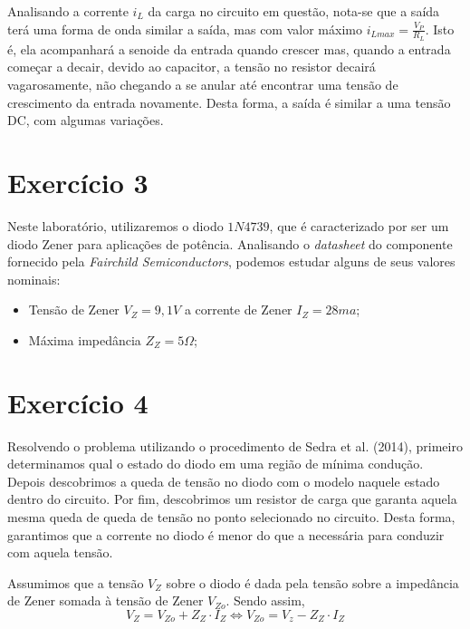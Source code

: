 \documentclass[12pt, a4paper, twoside]{article}
\begin{document}
Analisando a corrente $i_L$ da carga no circuito em questão, nota-se que a saída terá uma forma de onda similar a saída, mas com valor máximo $i_{Lmax} = \frac{V_P}{R_L}$. Isto é, ela acompanhará a senoide da entrada quando crescer mas, quando a entrada começar a decair, devido ao capacitor, a tensão no resistor decairá vagarosamente, não chegando a se anular até encontrar uma tensão de crescimento da entrada novamente. Desta forma, a saída é similar a uma tensão DC, com algumas variações.

\section{Exercício 3}

Neste laboratório, utilizaremos o diodo $1N4739$, que é caracterizado por ser um diodo Zener para aplicações de potência. Analisando o \textit{datasheet} do componente fornecido pela \textit{Fairchild Semiconductors}, podemos estudar alguns de seus valores nominais:

\begin{itemize}
    \item Tensão de Zener $V_Z = 9,1V$ a corrente de Zener $I_Z = 28ma$;
    \item Máxima impedância $Z_Z = 5 \Omega$;
\end{itemize}

\section{Exercício 4}

Resolvendo o problema utilizando o procedimento de Sedra et al. (2014), primeiro determinamos qual o estado do diodo em uma região de mínima condução. Depois descobrimos a queda de tensão no diodo com o modelo naquele estado dentro do circuito. Por fim, descobrimos um resistor de carga que garanta aquela mesma queda de queda de tensão no ponto selecionado no circuito. Desta forma, garantimos que a corrente no diodo é menor do que a necessária para conduzir com aquela tensão.

Assumimos que a tensão $V_Z$ sobre o diodo é dada pela tensão sobre a impedância de Zener somada à tensão de Zener $V_{Zo}$. Sendo assim,
$$ V_Z = V_{Zo} + Z_Z \cdot I_Z \Leftrightarrow V_{Zo} = V_z - Z_Z \cdot I_Z $$
\end{document}
